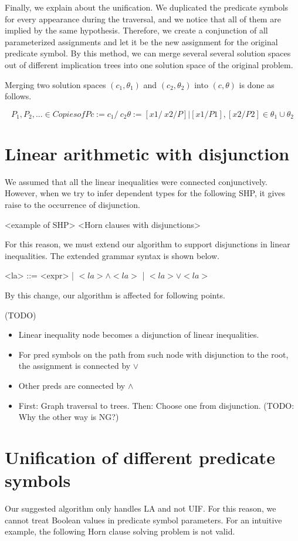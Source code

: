 \documentclass{llncs}
\begin{document}
Finally, we explain about the unification. We duplicated the predicate symbols for every appearance during the traversal, and we notice that all of them are implied by the same hypothesis. Therefore, we create a conjunction of all parameterized assignments and let it be the new assignment for the original predicate symbol. By this method, we can merge several several solution spaces out of different implication trees into one solution space of the original problem.

Merging two solution spaces $(c_1,\theta_1)$ and $(c_2,\theta_2)$ into $(c, \theta)$ is done as follows.

$$P_1, P_2, ... \in Copies of P
c := c_1 /\ c_2
\theta := { [ x1 /\ x2 / P ] | [x1/P1], [x2/P2] \in \theta_1 \cup \theta_2 }$$

\section{Linear arithmetic with disjunction}

We assumed that all the linear inequalities were connected conjunctively. However, when we try to infer dependent types for the following SHP, it gives raise to the occurrence of disjunction.

<example of SHP>
<Horn clauses with disjunctions>

For this reason, we must extend our algorithm to support disjunctions in linear inequalities. The extended grammar syntax is shown below.

\setlength{\grammarindent}{2em}
\begin{grammar}
<la> ::= <expr> | $<la> \wedge <la>$ | $<la> \vee <la>$
\end{grammar}

By this change, our algorithm is affected for following points.

(TODO)
\begin{itemize}
\item Linear inequality node becomes a disjunction of linear inequalities.
\item For pred symbols on the path from such node with disjunction to the root, the assignment is connected by $\vee$
\item Other preds are connected by $\wedge$
\item First: Graph traversal to trees. Then: Choose one from disjunction.
	(TODO: Why the other way is NG?)
\end{itemize}

\section{Unification of different predicate symbols}
Our suggested algorithm only handles LA and not UIF. For this reason, we cannot treat Boolean values in predicate symbol parameters. For an intuitive example, the following Horn clause solving problem is not valid.
\end{document}
